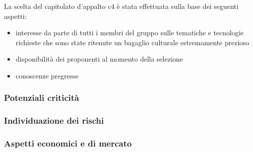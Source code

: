 La scelta del capitolato d’appalto c4 è stata effettuata sulla base dei seguenti aspetti:
\begin{itemize}
	\item interesse da parte di tutti i membri del gruppo sulle tematiche e tecnologie richieste che sono state ritenute un bagaglio culturale estremamente prezioso
	\item disponibilità dei proponenti al momento della selezione
	\item conoscenze pregresse
\end{itemize}

\subsubsection{Potenziali criticità}

\subsubsection{Individuazione dei rischi}

\subsubsection{ Aspetti economici e di mercato}

